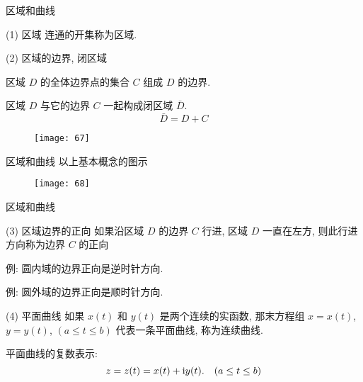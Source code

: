\documentclass{beamer}
\begin{document}
\begin{frame}{区域和曲线}
\begin{alertblock}{(1) 区域}
连通的开集称为区域. 
\end{alertblock}

\begin{alertblock}{(2) 区域的边界, 闭区域}
\begin{minipage}{0.6\linewidth}
区域 $ D $ 的全体边界点的集合 $ C $ 组成 $ D $ 的边界.  

区域 $ D $ 与它的边界 $ C $ 一起构成闭区域 $ \bar{D} $. 
\[{{\bar D}} = {{D}} + {{C}}\]
\end{minipage}\qquad
\begin{minipage}{0.3\linewidth}
\begin{figure}
	\texttt{[image: 67]}
\end{figure}
\end{minipage}
\end{alertblock}

\end{frame}

\begin{frame}{区域和曲线}
以上基本概念的图示
\begin{figure}
	\texttt{[image: 68]}
\end{figure}
\end{frame}

\begin{frame}{区域和曲线}
\begin{alertblock}{(3) 区域边界的正向}
如果沿区域 $ D $ 的边界 $ C $ 行进, 区域 $ D $ 一直在左方, 则此行进方向称为边界 $ C $ 的正向

例: 圆内域的边界正向是逆时针方向. 

例: 圆外域的边界正向是顺时针方向. 

\end{alertblock}

\begin{alertblock}{(4) 平面曲线}
如果 $ x(t) $ 和 $ y(t) $ 是两个连续的实函数, 那末方程组 $ x = x(t) $,   $ y = y(t) $,  $ (a \le t \le b) $ 代表一条平面曲线, 称为连续曲线.

平面曲线的复数表示: 
\[z = z(t) = x(t) + {\rm{i}}y(t).\quad (a \le t \le b)\]
\end{alertblock}
\end{frame}
\end{document}
